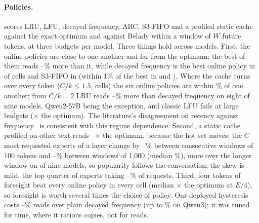 \documentclass[10pt,twocolumn]{article}
\begin{document}


\paragraph{Policies.}  scores LRU, LFU, decayed frequency, ARC, S3-FIFO and a profiled static cache
against the exact optimum and against Belady within a window of $W$ future tokens, at three budgets per model. Three
things hold across models. First, the online policies are close to one another and far from the optimum: the best of
them reads \polBestOnlineMin--\polBestOnlineMax\% more than it, while decayed frequency is the best online policy
in \polDfBest{} of \polCells{} cells and S3-FIFO in \polSsfBest{} (within 1\% of the best in \polDfNear{} and
\polSsfNear{}). Where the cache turns over every token ($C/k\le1.5$,
\polLruLowCells{} cells) the six online policies are within \polLowSpreadMax\% of one another; from $C/k{=}2$ LRU reads
\polLruMoreMin--\polLruMoreMax\% more than decayed frequency on eight of nine models, Qwen2-57B being the exception,
and classic LFU fails at large budgets (\polLfuMax$\times$ the optimum). The literature's disagreement on recency
against frequency~\cite{si2026expertcache,flashmoe2026,mira2026,specmd} is consistent with this regime dependence. Second, a static
cache profiled on other text reads \polStaticMin--\polStaticMax$\times$ the optimum, because the hot set moves: the
$C$ most requested experts of a layer change by \driftHundredMin--\driftHundredMax\% between consecutive windows of
100 tokens and \driftThousandMin--\driftThousandMax\% between windows of 1{,}000 (median \driftThousandMed\%), more
over the longer window on \driftRisingModels{} of nine models, so popularity follows the conversation; the skew is
mild, the top quarter of experts taking \skewQuarterMin--\skewQuarterMax\% of requests. Third, four tokens of
foresight beat every online policy in every cell (median \polWfourEquarter$\times$ the optimum at $E/4$), so foresight
is worth several times the choice of policy. Our deployed hysteresis costs \polKappaMin--\polKappaMax\% reads over
plain decayed frequency (up to \polKappaQwenMax\% on Qwen3); it was tuned for time, where it rations
copies, not for reads.
\end{document}
